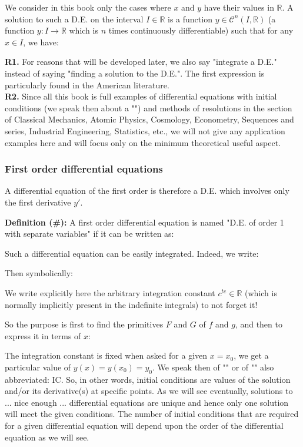 	We consider in this book only the cases where $x$ and $y$ have their values in $\mathbb{R}$. A solution to such a D.E. on the interval $I \in \mathbb{R}$ is a function $y \in \mathcal{C}^n (I,\mathbb{R})$ (a function $y:I \rightarrow \mathbb{R}$ which is $n$ times continuously differentiable) such that for any $x \in I$, we have:
	
	\begin{tcolorbox}[title=Remarks,colframe=black,arc=10pt]
	\textbf{R1.} For reasons that will be developed later, we also say "integrate a D.E." instead of saying "finding a solution to the D.E.". The first expression is particularly found in the American literature.\\
	
	\textbf{R2.} Since all this book is full examples of differential equations with initial conditions (we speak then about a "") and methods of resolutions in the section of Classical Mechanics, Atomic Physics, Cosmology, Econometry, Sequences and series, Industrial Engineering, Statistics, etc., we will not give any application examples here and will focus only on the minimum theoretical useful aspect.
	\end{tcolorbox}
	
	\pagebreak
	\subsubsection{First order differential equations}\label{first order differential equations}
	A differential equation of the first order is therefore a D.E. which involves only the first derivative $y'$.
	
	\textbf{Definition (\#\mydef):} A first order differential equation is named "D.E. of order 1 with separate variables" if it can be written as:
	
	Such a differential equation can be easily integrated. Indeed, we write:
	
	Then symbolically:
	
	\begin{tcolorbox}[title=Remark,colframe=black,arc=10pt]
	We write explicitly here the arbitrary integration constant $c^{te} \in \mathbb{R}$ (which is normally implicitly present in the indefinite integrals) to not forget it!
	\end{tcolorbox}
	So the purpose is first to find the primitives $F$ and $G$ of $f$ and $g$, and then to express it in terms of $x$:
	
	The integration constant is fixed when asked for a given $x=x_0$, we get a particular value of $y(x)=y(x_0)=y_0$. We speak then of "" or of "\label{initial conditions}" also abbreviated: IC. So, in other words, initial conditions are values of the solution and/or its derivative(s) at specific points.  As we will see eventually, solutions to ... nice enough ... differential equations are unique and hence only one solution will meet the given conditions. The number of initial conditions that are required for a given differential equation will depend upon the order of the differential equation as we will see.
	
